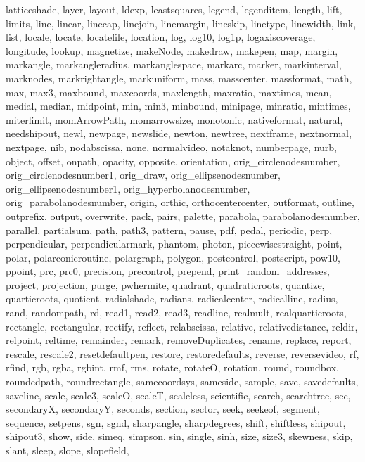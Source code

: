 {{  latticeshade, layer, layout, ldexp, leastsquares, legend, legenditem,
  length, lift, limits, line, linear, linecap, linejoin, linemargin,
  lineskip, linetype, linewidth, link, list, locale, locate, locatefile,
  location, log, log10, log1p, logaxiscoverage, longitude, lookup, magnetize,
  makeNode, makedraw, makepen, map, margin, markangle, markangleradius,
  markanglespace, markarc, marker, markinterval, marknodes, markrightangle,
  markuniform, mass, masscenter, massformat, math, max, max3, maxbound,
  maxcoords, maxlength, maxratio, maxtimes, mean, medial, median, midpoint,
  min, min3, minbound, minipage, minratio, mintimes, miterlimit,
  momArrowPath, momarrowsize, monotonic, nativeformat, natural, needshipout,
  newl, newpage, newslide, newton, newtree, nextframe, nextnormal, nextpage,
  nib, nodabscissa, none, normalvideo, notaknot, numberpage, nurb, object,
  offset, onpath, opacity, opposite, orientation, orig_circlenodesnumber,
  orig_circlenodesnumber1, orig_draw, orig_ellipsenodesnumber,
  orig_ellipsenodesnumber1, orig_hyperbolanodesnumber,
  orig_parabolanodesnumber, origin, orthic, orthocentercenter, outformat,
  outline, outprefix, output, overwrite, pack, pairs, palette, parabola,
  parabolanodesnumber, parallel, partialsum, path, path3, pattern, pause,
  pdf, pedal, periodic, perp, perpendicular, perpendicularmark, phantom,
  photon, piecewisestraight, point, polar, polarconicroutine, polargraph,
  polygon, postcontrol, postscript, pow10, ppoint, prc, prc0, precision,
  precontrol, prepend, print_random_addresses, project, projection, purge,
  pwhermite, quadrant, quadraticroots, quantize, quarticroots, quotient,
  radialshade, radians, radicalcenter, radicalline, radius, rand, randompath,
  rd, read1, read2, read3, readline, realmult, realquarticroots, rectangle,
  rectangular, rectify, reflect, relabscissa, relative, relativedistance,
  reldir, relpoint, reltime, remainder, remark, removeDuplicates, rename,
  replace, report, rescale, rescale2, resetdefaultpen, restore,
  restoredefaults, reverse, reversevideo, rf, rfind, rgb, rgba, rgbint, rmf,
  rms, rotate, rotateO, rotation, round, roundbox, roundedpath,
  roundrectangle, samecoordsys, sameside, sample, save, savedefaults,
  saveline, scale, scale3, scaleO, scaleT, scaleless, scientific, search,
  searchtree, sec, secondaryX, secondaryY, seconds, section, sector, seek,
  seekeof, segment, sequence, setpens, sgn, sgnd, sharpangle, sharpdegrees,
  shift, shiftless, shipout, shipout3, show, side, simeq, simpson, sin,
  single, sinh, size, size3, skewness, skip, slant, sleep, slope, slopefield,
}}
